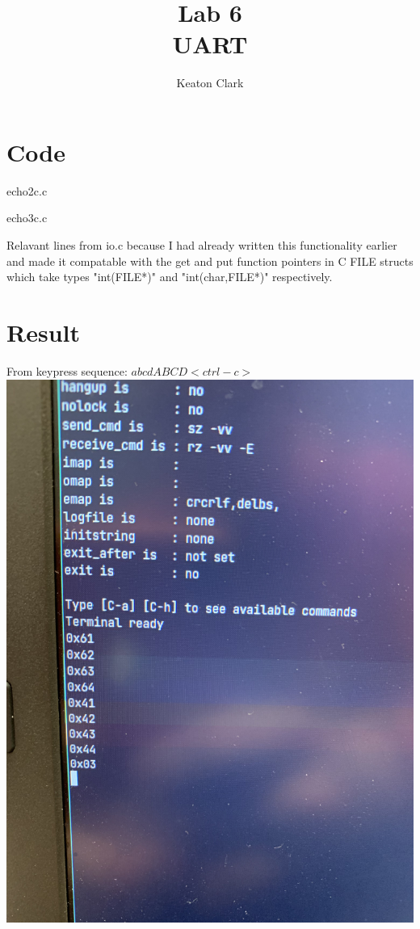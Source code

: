 \documentclass[]{article}
\title{Lab 6\\UART}
\author{Keaton Clark}
\begin{document}
\maketitle
\section*{Code}
	echo2c.c
	
	\pagebreak
	echo3c.c
	
	\pagebreak
	Relavant lines from io.c because I had already written this functionality earlier and made it compatable with the get and put function pointers in C FILE structs which take types "int(FILE*)" and "int(char,FILE*)" respectively.
	
\section*{Result}
	From keypress sequence: $abcdABCD<ctrl-c>$\\
	\includegraphics[scale=.1,angle=-90]{./images/1.jpg}
\end{document}
